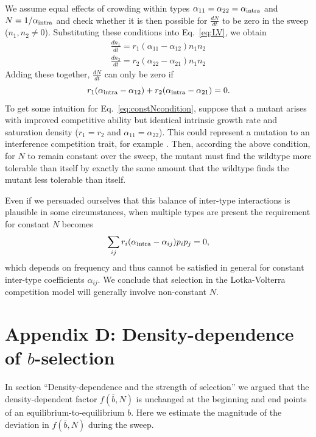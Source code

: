 \documentclass[11pt]{article}
\begin{document}
We assume equal effects of crowding within types $\alpha_{11}=\alpha_{22}=\alpha_{\rm intra}$ and $N=1/\alpha_{\rm intra}$ and check whether it is then possible for $\frac{dN}{dt}$ to be zero in the sweep ($n_1,n_2 \neq 0$). Substituting these conditions into Eq.~\eqref{eq:LV}, we obtain 
\begin{align}
\frac{d n_1}{dt} = r_1(\alpha_{11}-\alpha_{12})n_1n_2 \nonumber\\
\frac{d n_2}{dt} = r_2(\alpha_{22}-\alpha_{21})n_1n_2
\end{align}
Adding these together, $\frac{dN}{dt}$ can only be zero if 
\begin{equation}
r_1(\alpha_{\rm intra}-\alpha_{12})+r_2(\alpha_{\rm intra}-\alpha_{21})=0. \label{eq:constNcondition}
\end{equation}
To get some intuition for Eq.~\eqref{eq:constNcondition}, suppose that a mutant arises with improved competitive ability but identical intrinsic growth rate and saturation density ($r_1=r_2$ and $\alpha_{11}=\alpha_{22}$). This could represent a mutation to an interference competition trait, for example \citep{gill_1974}. Then, according the above condition, for $N$ to remain constant over the sweep, the mutant must find the wildtype more tolerable than itself by exactly the same amount that the wildtype finds the mutant less tolerable than itself. 

Even if we persuaded ourselves that this balance of inter-type interactions is plausible in some circumstances, when multiple types are present the requirement for constant $N$ becomes
\begin{equation}
\sum_{ij}r_i(\alpha_{\rm intra}-\alpha_{ij})p_ip_j=0,
\end{equation}
which depends on frequency and thus cannot be satisfied in general for constant inter-type coefficients $\alpha_{ij}$. We conclude that selection in the Lotka-Volterra competition model will generally involve non-constant $N$.

\section*{Appendix D: Density-dependence of $b$-selection}

In section ``Density-dependence and the strength of selection'' we argued that the density-dependent factor $f(\overline{b},N)$ is unchanged at the beginning and end points of an equilibrium-to-equilibrium $b$. Here we estimate the magnitude of the deviation in $f(\overline{b},N)$ during the sweep. 
\end{document}
